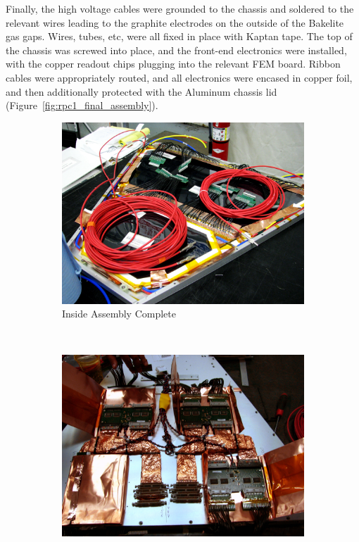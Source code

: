 Finally, the high voltage cables were grounded to the chassis and soldered to
the relevant wires leading to the graphite electrodes on the outside of the
Bakelite gas gaps. Wires, tubes, etc, were all fixed in place with Kaptan tape.
The top of the chassis was screwed into place, and the front-end electronics
were installed, with the copper readout chips plugging into the relevant FEM
board.  Ribbon cables were appropriately routed, and all electronics were
encased in copper foil, and then additionally protected with the Aluminum
chassis lid (Figure~\ref{fig:rpc1_final_assembly}).

\begin{figure}
  \centering
  \begin{subfigure}[b]{0.5\textwidth}
    \centering
    \includegraphics[width=\linewidth]{./figures/rpc1_construction_7}
    \caption{Inside Assembly Complete}
    \label{fig:rpc1_assembled}
  \end{subfigure}%
  ~
  \begin{subfigure}[b]{0.5\textwidth}
    \centering
    \includegraphics[width=\linewidth]{./figures/rpc1_construction_8}

\end{subfigure}
\end{figure}
